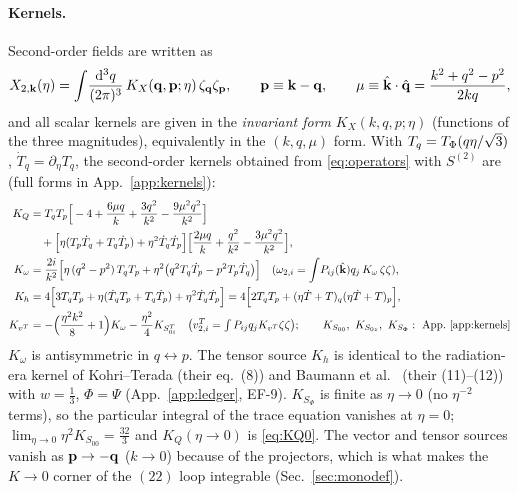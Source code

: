 \paragraph{Kernels.}
Second-order fields are written as
\begin{equation}
X_{2,\mathbf k}(\eta)=\int\!\frac{\mathrm d^3q}{(2\pi)^3}\,K_X(\mathbf q,\mathbf p;\eta)\,\zeta_{\mathbf q}\zeta_{\mathbf p},\qquad \mathbf p\equiv\mathbf k-\mathbf q,
\qquad \mu\equiv\hat{\mathbf k}\cdot\hat{\mathbf q}=\frac{k^2+q^2-p^2}{2kq},
\label{eq:kernel_def}
\end{equation}
and all scalar kernels are given in the \emph{invariant form} $K_X(k,q,p;\eta)$ (functions of the three
magnitudes), equivalently in the $(k,q,\mu)$ form.  With $T_q=T_\Phi(q\eta/\sqrt3)$, $\dot T_q=\partial_\eta T_q$,
the second-order kernels obtained from \eqref{eq:operators} with $S^{(2)}$ are (full forms in App.~\ref{app:kernels}):
\begin{align}
K_Q&=T_qT_p\Big[-4+\frac{6\mu q}k+\frac{3q^2}{k^2}-\frac{9\mu^2q^2}{k^2}\Big]\nonumber\\
&\quad+\Big[\eta(T_p\dot T_q+T_q\dot T_p)+\eta^2\dot T_q\dot T_p\Big]\Big[\frac{2\mu q}k+\frac{q^2}{k^2}-\frac{3\mu^2q^2}{k^2}\Big],\nonumber\\
K_\omega&=\frac{2i}{k^2}\Big[\eta\,(q^2-p^2)\,T_qT_p+\eta^2\big(q^2T_q\dot T_p-p^2T_p\dot T_q\big)\Big]
\quad(\omega_{2,i}=\int\!P_{ij}(\hat{\mathbf k})q_j\,K_\omega\,\zeta\zeta),\nonumber\\
K_h&=4\Big[3T_qT_p+\eta(\dot T_qT_p+T_q\dot T_p)+\eta^2\dot T_q\dot T_p\Big]
=4\Big[2T_qT_p+(\eta\dot T+T)_q(\eta\dot T+T)_p\Big],\nonumber\\
K_{v^T}&=-\Big(\frac{\eta^2k^2}8+1\Big)K_\omega-\frac{\eta^2}4K_{S^T_{0i}}\quad\big(v^T_{2,i}=\textstyle\int P_{ij}q_jK_{v^T}\zeta\zeta\big);\qquad
K_{S_{00}},\ K_{S_{0z}},\ K_{S_\Phi}:\ \text{App.~\ref{app:kernels}}
\label{eq:second_kernels}
\end{align}
$K_\omega$ is antisymmetric in $q\leftrightarrow p$.  The tensor source $K_h$ is identical to the radiation-era kernel of Kohri--Terada \cite{KT} (their eq.~(8)) and
Baumann et al.\ \cite{Baumann} (their (11)--(12)) with $w=\tfrac13$, $\Phi=\Psi$ (App.~\ref{app:ledger}, EF-9).
$K_{S_\Phi}$ is finite as $\eta\to0$ (no $\eta^{-2}$ terms), so the particular integral of the trace equation
vanishes at $\eta=0$; $\lim_{\eta\to0}\eta^2K_{S_{00}}=\tfrac{32}3$ and $K_Q(\eta\to0)$ is \eqref{eq:KQ0}.
The vector and tensor sources vanish as $\mathbf p\to-\mathbf q$ ($k\to0$) because of the projectors, which is what makes
the $K\to0$ corner of the $(22)$ loop integrable (Sec.~\ref{sec:monodef}).


